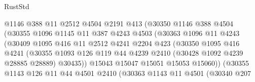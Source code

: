 \begin{lexlean}{RustStd}
\begin{coremodule}
                              @1146
                              @388
                              @11
                              @2512
                              @4504
                              @2191
                              @413
                              (@30350
                                @1146
                                @388
                                @4504
                                (@30355
                                  @1096
                                  @1145
                                  @11
                                  @387
                                  @4243
                                  @4503
                                  (@30363
                                    @1096
                                    @11
                                    @4243
                                    (@30409
                                      @1095
                                      @416
                                      @11
                                      @2512
                                      @4241
                                      @2204
                                      @423
                                      (@30350
                                        @1095
                                        @416
                                        @4241
                                        (@30355
                                          @1093
                                          @126
                                          @119
                                          @44
                                          @4239
                                          @2410
                                          (@30428 @1092 @4239 @28885 @28889)
                                          @30435))
                                      @15043
                                      @15047
                                      @15051
                                      @15053
                                      @15060))
                                  (@30355
                                    @1143
                                    @126
                                    @11
                                    @44
                                    @4501
                                    @2410
                                    (@30363
                                      @1143
                                      @11
                                      @4501
                                      (@30340
                                        @207

\end{coremodule}
\end{lexlean}
